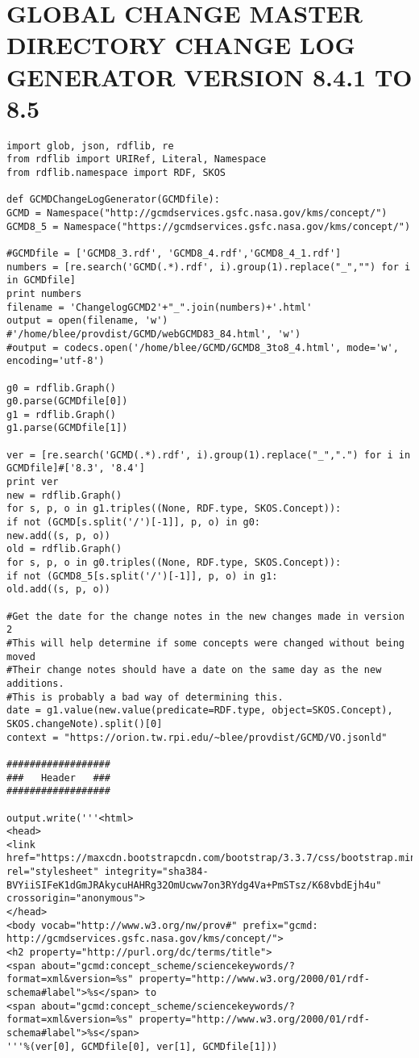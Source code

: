 \chapter{GLOBAL CHANGE MASTER DIRECTORY CHANGE LOG GENERATOR VERSION 8.4.1 TO 8.5}
\begin{verbatim}
import glob, json, rdflib, re
from rdflib import URIRef, Literal, Namespace
from rdflib.namespace import RDF, SKOS

def GCMDChangeLogGenerator(GCMDfile):
GCMD = Namespace("http://gcmdservices.gsfc.nasa.gov/kms/concept/")
GCMD8_5 = Namespace("https://gcmdservices.gsfc.nasa.gov/kms/concept/")

#GCMDfile = ['GCMD8_3.rdf', 'GCMD8_4.rdf','GCMD8_4_1.rdf']
numbers = [re.search('GCMD(.*).rdf', i).group(1).replace("_","") for i in GCMDfile]
print numbers
filename = 'ChangelogGCMD2'+"_".join(numbers)+'.html'
output = open(filename, 'w') #'/home/blee/provdist/GCMD/webGCMD83_84.html', 'w')
#output = codecs.open('/home/blee/GCMD/GCMD8_3to8_4.html', mode='w', encoding='utf-8')

g0 = rdflib.Graph()
g0.parse(GCMDfile[0])
g1 = rdflib.Graph()
g1.parse(GCMDfile[1])

ver = [re.search('GCMD(.*).rdf', i).group(1).replace("_",".") for i in GCMDfile]#['8.3', '8.4']
print ver
new = rdflib.Graph()
for s, p, o in g1.triples((None, RDF.type, SKOS.Concept)):
if not (GCMD[s.split('/')[-1]], p, o) in g0:
new.add((s, p, o))
old = rdflib.Graph()
for s, p, o in g0.triples((None, RDF.type, SKOS.Concept)):
if not (GCMD8_5[s.split('/')[-1]], p, o) in g1:
old.add((s, p, o))

#Get the date for the change notes in the new changes made in version 2
#This will help determine if some concepts were changed without being moved
#Their change notes should have a date on the same day as the new additions.
#This is probably a bad way of determining this.
date = g1.value(new.value(predicate=RDF.type, object=SKOS.Concept), SKOS.changeNote).split()[0]
context = "https://orion.tw.rpi.edu/~blee/provdist/GCMD/VO.jsonld"

##################
###   Header   ###
##################

output.write('''<html>
<head>
<link href="https://maxcdn.bootstrapcdn.com/bootstrap/3.3.7/css/bootstrap.min.css" rel="stylesheet" integrity="sha384-BVYiiSIFeK1dGmJRAkycuHAHRg32OmUcww7on3RYdg4Va+PmSTsz/K68vbdEjh4u" crossorigin="anonymous">
</head>
<body vocab="http://www.w3.org/nw/prov#" prefix="gcmd: http://gcmdservices.gsfc.nasa.gov/kms/concept/">
<h2 property="http://purl.org/dc/terms/title">
<span about="gcmd:concept_scheme/sciencekeywords/?format=xml&version=%s" property="http://www.w3.org/2000/01/rdf-schema#label">%s</span> to 
<span about="gcmd:concept_scheme/sciencekeywords/?format=xml&version=%s" property="http://www.w3.org/2000/01/rdf-schema#label">%s</span>
'''%(ver[0], GCMDfile[0], ver[1], GCMDfile[1]))


\end{verbatim}

